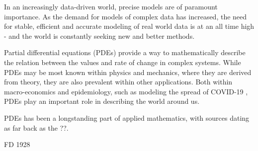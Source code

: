 In an increasingly data-driven world, precise models are of paramount importance.
As the demand for models of complex data has increased, the need for stable, efficient and accurate modeling of real world data is at an all time high - and the world is constantly seeking new and better methods.

Partial differential equations (PDEs) provide a way to mathematically describe the relation between the values and rate of change in complex systems.
While PDEs may be most known within physics and mechanics, where they are derived from theory, they are also prevalent within other applications.
Both within macro-economics \cite{ecoPDE} and epidemiology, such as modeling the spread of COVID-19 \cite{covidus}, PDEs play an important role in describing the world around us. 

PDEs has been a longstanding part of applied mathematics, with sources dating as far back as the ??. 

FD 1928 





